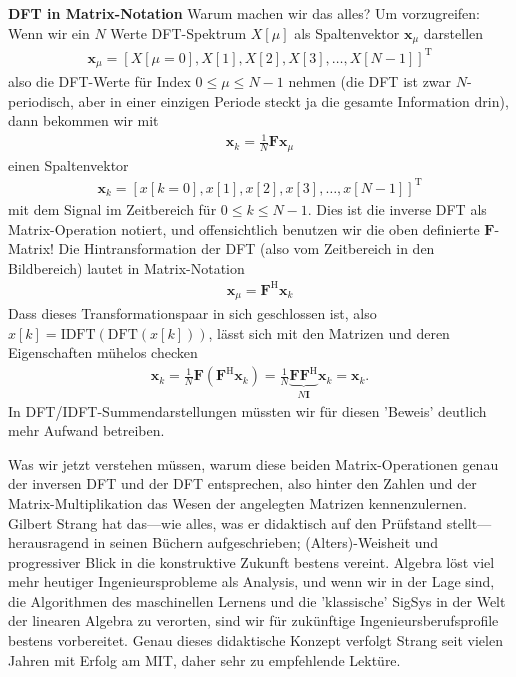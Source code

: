 \textbf{DFT in Matrix-Notation}
Warum machen wir das alles? Um vorzugreifen:
%
Wenn wir ein $N$ Werte DFT-Spektrum $X[\mu]$ als Spaltenvektor $\bm{x}_\mu$ darstellen
\begin{align}
\bm{x}_\mu = [X[\mu=0],X[1],X[2],X[3],\dots,X[N-1]]^\mathrm{T}
\end{align}
also die DFT-Werte für Index $0 \leq \mu \leq N-1$ nehmen
(die DFT ist zwar $N$-periodisch,
aber in einer einzigen Periode steckt ja die gesamte Information drin),
dann bekommen wir mit
\begin{align}
\bm{x}_k = \frac{1}{N} \bm{F} \bm{x}_\mu
\end{align}
einen Spaltenvektor
\begin{align}
\bm{x}_k = [x[k=0],x[1], x[2], x[3], \dots, x[N-1]]^\mathrm{T}
\end{align}
mit dem Signal im Zeitbereich für $0 \leq k \leq N-1$.
Dies ist die inverse DFT als Matrix-Operation notiert, und offensichtlich
benutzen wir die oben definierte $\bm{F}$-Matrix!
%
Die Hintransformation der DFT
(also vom Zeitbereich in den Bildbereich) lautet in Matrix-Notation
\begin{align}
\bm{x}_\mu = \bm{F}^\mathrm{H} \bm{x}_k
\end{align}
%
Dass dieses Transformationspaar in sich geschlossen ist, also
$x[k] = \text{IDFT}(\text{DFT}(x[k]))$,
lässt sich mit den Matrizen und deren Eigenschaften mühelos checken
\begin{align}
\bm{x}_k =
\frac{1}{N} \bm{F} (\bm{F}^\mathrm{H} \bm{x}_k)=
\frac{1}{N} \underbrace{\bm{F} \bm{F}^\mathrm{H}}_{N \bm{I}} \bm{x}_k = \bm{x}_k.
\end{align}
In DFT/IDFT-Summendarstellungen müssten wir für diesen 'Beweis' deutlich mehr Aufwand
betreiben.

Was wir jetzt verstehen müssen, warum diese beiden Matrix-Operationen
genau der inversen DFT und der DFT entsprechen, also hinter den Zahlen
und der Matrix-Multiplikation das Wesen der angelegten Matrizen kennenzulernen.
%
Gilbert Strang hat das---wie alles, was er didaktisch auf den Prüfstand
stellt---herausragend in seinen Büchern
\cite{Strang2010, Strang2016, Strang2019}
aufgeschrieben; (Alters)-Weisheit und progressiver Blick in die konstruktive
Zukunft bestens vereint. Algebra löst viel
mehr heutiger Ingenieursprobleme als Analysis, und wenn wir in der Lage sind,
die Algorithmen des maschinellen Lernens und die 'klassische' SigSys in der Welt
der linearen Algebra zu verorten, sind wir für zukünftige Ingenieursberufsprofile
bestens vorbereitet. Genau dieses didaktische Konzept verfolgt Strang seit vielen
Jahren mit Erfolg am MIT, daher sehr zu empfehlende Lektüre.

